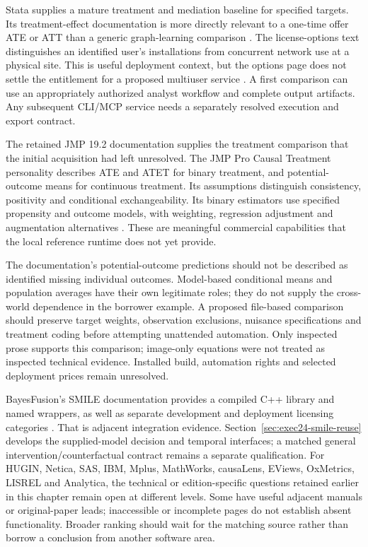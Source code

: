 Stata supplies a mature treatment and mediation baseline for specified targets.
Its treatment-effect documentation is more directly relevant to a one-time
offer ATE or ATT than a generic graph-learning comparison
\citep{exec13_ci_stata_causal_intro}. The license-options text distinguishes
an identified user's installations from concurrent network use at a physical
site. This is useful deployment context, but the options page does not settle
the entitlement for a proposed multiuser service
\citep{exec13_ivrd_license}. A first comparison can use an appropriately
authorized analyst workflow and complete output artifacts. Any subsequent
CLI/MCP service needs a separately resolved execution and export contract.

The retained JMP 19.2 documentation supplies the treatment comparison that
the initial acquisition had left unresolved. The JMP Pro Causal Treatment personality describes ATE and
ATET for binary treatment, and potential-outcome means for continuous treatment.
Its assumptions distinguish consistency, positivity and conditional
exchangeability. Its binary estimators use specified propensity and outcome
models, with weighting, regression adjustment and augmentation alternatives
\citep{exec13_ch_jmp_causal}. These are meaningful commercial capabilities
that the local reference runtime does not yet provide.

The documentation's potential-outcome predictions should not be described as
identified missing individual outcomes. Model-based conditional means and
population averages have their own legitimate roles; they do not supply the
cross-world dependence in the borrower example. A proposed file-based
comparison should preserve target weights, observation exclusions, nuisance
specifications and treatment coding before attempting unattended automation.
Only inspected prose supports this comparison; image-only equations were not
treated as inspected technical evidence. Installed build, automation rights
and selected deployment prices remain unresolved.

BayesFusion's SMILE documentation provides a compiled C++ library and named
wrappers, as well as separate development and deployment licensing categories
\citep{exec13_smile_intro,exec13_smile_license}. That is adjacent integration
evidence. Section~\ref{sec:exec24-smile-reuse} develops the supplied-model
decision and temporal interfaces; a matched general intervention/counterfactual
contract remains a separate qualification.
For HUGIN, Netica, SAS, IBM, Mplus, MathWorks, causaLens, EViews, OxMetrics,
LISREL and Analytica, the technical or edition-specific questions retained
earlier in this chapter remain open at different levels. Some have useful
adjacent manuals or original-paper leads; inaccessible or incomplete pages
do not establish absent functionality. Broader ranking should wait for the
matching source rather than borrow a conclusion from another software area. \citep{exec14_ci_comparison}

